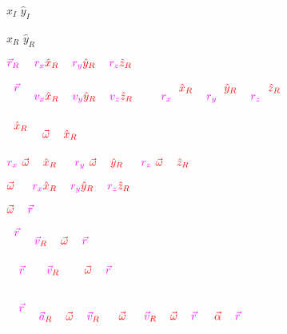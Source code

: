 \documentclass{article}
\begin{document}
\begin{center}\huge{

\color{white}
$\hat{x}_I$   $\hat{y}_I$

\color{red}
$\hat{x}_R$   $\hat{y}_R$

$
\color{magenta}\vec{r}_R
\color{white}=
\color{magenta}r_x\color{red}\hat{x}_R
\color{white}+
\color{magenta}r_y\color{red}\hat{y}_R
\color{white}+
\color{magenta}r_z\color{red}\hat{z}_R
$

$
\color{white}\cfrac{d\color{magenta}\vec{r}}{dt}=
\color{magenta}v_x\color{red}\hat{x}_R
\color{white}+
\color{magenta}v_y\color{red}\hat{y}_R
\color{white}+
\color{magenta}v_z\color{red}\hat{z}_R
\color{white}+...
$
$
\color{magenta}r_x\color{white}\cfrac{d\color{red}\hat{x}_R\color{white}}{dt}+
\color{magenta}r_y\color{white}\cfrac{d\color{red}\hat{y}_R\color{white}}{dt}+
\color{magenta}r_z\color{white}\cfrac{d\color{red}\hat{z}_R\color{white}}{dt}
$

$
\color{white}\cfrac{d\color{red}\hat{x}_R\color{white}}{dt}=
\color{red}\vec{\omega}\color{white}\times \color{red}\hat{x}_R
$

$
\color{magenta}r_x\color{white}(\color{red}\vec{\omega}\color{white}\times\color{red}\hat{x}_R\color{white})+
\color{magenta}r_y\color{white}(\color{red}\vec{\omega}\color{white}\times\color{red}\hat{y}_R\color{white})+
\color{magenta}r_z\color{white}(\color{red}\vec{\omega}\color{white}\times\color{red}\hat{z}_R\color{white})
$


$
\color{red}\vec{\omega}
\color{white}\times(
\color{magenta}r_x\color{white}\color{red}\hat{x}_R\color{white}+
\color{magenta}r_y\color{white}\color{red}\hat{y}_R\color{white}+
\color{magenta}r_z\color{white}\color{red}\hat{z}_R\color{white}
\color{white})
$

$
\color{red}\vec{\omega}
\color{white}\times
\color{magenta}\vec{r}
$

$
\color{white}\cfrac{d\color{magenta}\vec{r}}{dt}=
\color{magenta}\vec{v}_{\color{red}R}
\color{white}+
\color{red}\vec{\omega}
\color{white}\times
\color{magenta}\vec{r}
$

$
\color{white}\cfrac{d^2\color{magenta}\vec{r}}{dt^2}=
\color{white}\cfrac{d\color{magenta}\vec{v}_{\color{red}R}}{dt}+
\color{white}\cfrac{d(
\color{red}\vec{\omega}
\color{white}\times
\color{magenta}\vec{r}\color{white})}{dt}
$

$
\color{white}\cfrac{d^2\color{magenta}\vec{r}}{dt^2}=
\color{magenta}\vec{a}_{\color{red}R}\color{white}+
\color{red}\vec{\omega}\color{white}\times
\color{magenta}\vec{v}_{\color{red}R}$ $\color{white}+
$
$
\color{red}\vec{\omega}
\color{white}\times(
\color{magenta}\vec{v}_{\color{red}R}\color{white}+
\color{red}\vec{\omega}\color{white}\times
\color{magenta}\vec{r}\color{white})+
\color{red}\vec{\alpha}\color{white}\times\color{magenta}\vec{r}
$

}
\end{center}
\end{document}
